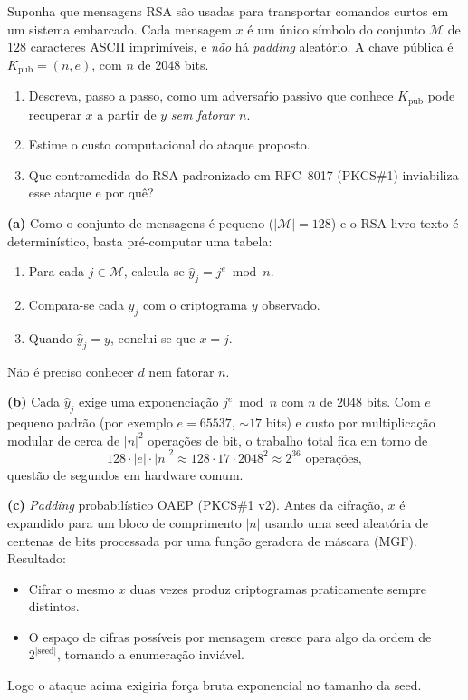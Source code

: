 \documentclass[12pt,a4paper]{article}
\begin{document}
\begin{exercicio}
Suponha que mensagens RSA s\~{a}o usadas para transportar comandos curtos em um sistema embarcado. Cada mensagem $x$ \'{e} um \'{u}nico s\'{i}mbolo do conjunto $\mathcal{M}$ de $128$ caracteres ASCII imprim\'{i}veis, e \emph{n\~{a}o} h\'{a} \emph{padding} aleat\'{o}rio. A chave p\'{u}blica \'{e} $K_{\text{pub}} = (n, e)$, com $n$ de $2048$ bits.
\begin{enumerate}[label=(\alph*)]
    \item Descreva, passo a passo, como um adversa\'{r}io passivo que conhece $K_{\text{pub}}$ pode recuperar $x$ a partir de $y$ \emph{sem fatorar $n$}.
    \item Estime o custo computacional do ataque proposto.
    \item Que contramedida do RSA padronizado em RFC~8017 (PKCS\#1) inviabiliza esse ataque e por qu\^{e}?
\end{enumerate}

\begin{resposta}
\textbf{(a)} Como o conjunto de mensagens \'{e} pequeno ($|\mathcal{M}| = 128$) e o RSA livro-texto \'{e} determin\'{i}stico, basta pr\'{e}-computar uma tabela:
\begin{enumerate}[label=\arabic*.,leftmargin=1.4em,topsep=2pt,itemsep=1pt]
    \item Para cada $j \in \mathcal{M}$, calcula-se $\hat y_j = j^{e} \bmod n$.
    \item Compara-se cada $\hat y_j$ com o criptograma $y$ observado.
    \item Quando $\hat y_j = y$, conclui-se que $x = j$.
\end{enumerate}
N\~{a}o \'{e} preciso conhecer $d$ nem fatorar $n$.

\textbf{(b)} Cada $\hat y_j$ exige uma exponencia\c{c}\~{a}o $j^{e} \bmod n$ com $n$ de $2048$ bits. Com $e$ pequeno padr\~{a}o (por exemplo $e = 65537$, $\sim 17$ bits) e custo por multiplica\c{c}\~{a}o modular de cerca de $|n|^{2}$ opera\c{c}\~{o}es de bit, o trabalho total fica em torno de
\[
128 \cdot |e| \cdot |n|^{2} \approx 128 \cdot 17 \cdot 2048^{2} \approx 2^{36} \text{ opera\c{c}\~{o}es},
\]
quest\~{a}o de segundos em hardware comum.

\textbf{(c)} \emph{Padding} probabil\'{i}stico OAEP (PKCS\#1 v2). Antes da cifra\c{c}\~{a}o, $x$ \'{e} expandido para um bloco de comprimento $|n|$ usando uma seed aleat\'{o}ria de centenas de bits processada por uma fun\c{c}\~{a}o geradora de m\'{a}scara (MGF). Resultado:
\begin{itemize}[leftmargin=1.4em,topsep=2pt,itemsep=1pt]
    \item Cifrar o mesmo $x$ duas vezes produz criptogramas praticamente sempre distintos.
    \item O espa\c{c}o de cifras poss\'{i}veis por mensagem cresce para algo da ordem de $2^{|\text{seed}|}$, tornando a enumera\c{c}\~{a}o invi\'{a}vel.
\end{itemize}
Logo o ataque acima exigiria for\c{c}a bruta exponencial no tamanho da seed.
\end{resposta}
\end{exercicio}
\end{document}
